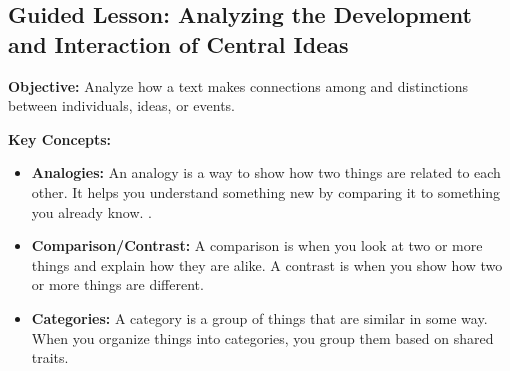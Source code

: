 \documentclass[12pt]{article}
\title{}
\date{}
\begin{document}
\subsection*{Guided Lesson: Analyzing the Development and Interaction of Central Ideas}
\onehalfspacing

\begin{tcolorbox}[colframe=black!40, colback=gray!5, 
coltitle=black, colbacktitle=black!20, fonttitle=\bfseries\Large, 
title=Learning Objective, halign title=center, left=5pt, right=5pt, top=5pt, bottom=15pt]
\textbf{Objective:} Analyze how a text makes connections among and distinctions between individuals, ideas, or events.
\end{tcolorbox}

\vspace{1em}

\begin{tcolorbox}[colframe=black!60, colback=white, 
coltitle=black, colbacktitle=black!15, fonttitle=\bfseries\Large, 
title=Key Concepts and Vocabulary, halign title=center, left=10pt, right=10pt, top=10pt, bottom=15pt]
\textbf{Key Concepts:}
\begin{itemize}
    \item \textbf{Analogies:} An analogy is a way to show how two things are related to each other. It helps you understand something new by comparing it to something you already know. .
    \item \textbf{Comparison/Contrast:} A comparison is when you look at two or more things and explain how they are alike. A contrast is when you show how two or more things are different.
    \item \textbf{Categories:} A category is a group of things that are similar in some way. When you organize things into categories, you group them based on shared traits.
\end{itemize}
\end{tcolorbox}

\vspace{1em}
\end{document}
